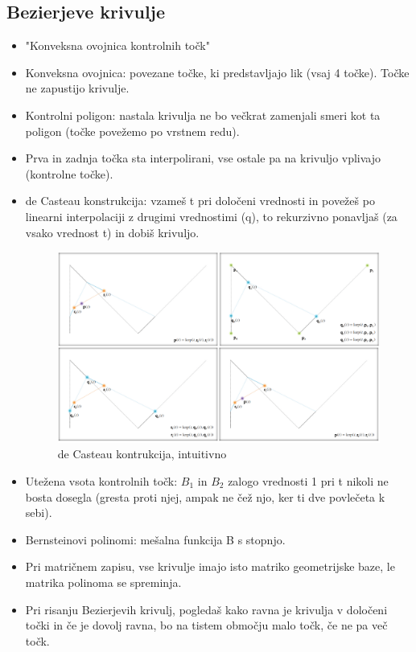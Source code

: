 \documentclass{article}
\begin{document}
\subsection{Bezierjeve krivulje}
\begin{itemize}
    \item "Konveksna ovojnica kontrolnih točk"
    \item Konveksna ovojnica: povezane točke, ki predstavljajo lik (vsaj 4 točke). Točke ne zapustijo krivulje.
    \item Kontrolni poligon: nastala krivulja ne bo večkrat zamenjali smeri kot ta poligon (točke povežemo po vrstnem redu).
    \item Prva in zadnja točka sta interpolirani, vse ostale pa na krivuljo vplivajo (kontrolne točke).
    \item de Casteau konstrukcija: vzameš t pri določeni vrednosti in povežeš po linearni interpolaciji z drugimi vrednostimi (q), to rekurzivno ponavljaš (za vsako vrednost t) in dobiš krivuljo. 
        \begin{figure}[H]
        \centering
        \includegraphics[width=120mm]{src/de_casteau_kontrukcija.png}
        \caption{de Casteau kontrukcija, intuitivno}
        \end{figure}     
    \item Utežena vsota kontrolnih točk: $B_1$ in $B_2$ zalogo vrednosti 1 pri t nikoli ne bosta dosegla (gresta proti njej, ampak ne čež njo, ker ti dve povlečeta k sebi).
    \item Bernsteinovi polinomi: mešalna funkcija B s stopnjo.
    \item Pri matričnem zapisu, vse krivulje imajo isto matriko geometrijske baze, le matrika polinoma se spreminja.
    \item Pri risanju Bezierjevih krivulj, pogledaš kako ravna je krivulja v določeni točki in če je dovolj ravna, bo na tistem območju malo točk, če ne pa več točk.

\end{itemize}
\end{document}
